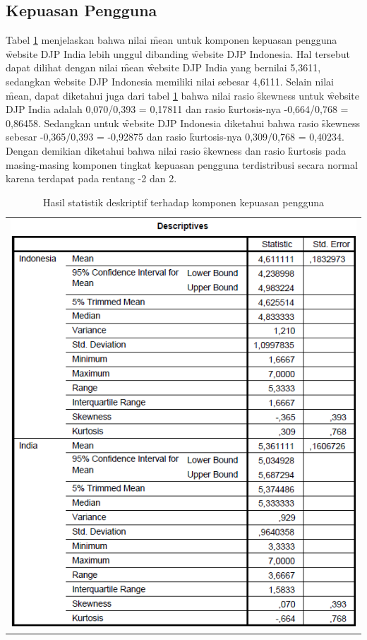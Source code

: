 \subsection{Kepuasan Pengguna}
Tabel \ref{tab:descsat} menjelaskan bahwa nilai \f{mean} untuk komponen kepuasan pengguna \f{website} DJP India lebih unggul dibanding \f{website} DJP Indonesia. Hal tersebut dapat dilihat dengan nilai \f{mean} \f{website} DJP India yang bernilai 5,3611, sedangkan \f{website} DJP Indonesia memiliki nilai sebesar 4,6111. Selain nilai \f{mean}, dapat diketahui juga dari tabel \ref{tab:descsat} bahwa nilai rasio \f{skewness} untuk \f{website} DJP India adalah 0,070/0,393 = 0,17811 dan rasio \f{kurtosis}-nya -0,664/0,768 = 0,86458. Sedangkan untuk \f{website} DJP Indonesia diketahui bahwa rasio \f{skewness} sebesar -0,365/0,393 = -0,92875 dan rasio \f{kurtosis}-nya 0,309/0,768 = 0,40234. Dengan demikian diketahui bahwa nilai rasio \f{skewness} dan rasio \f{kurtosis} pada masing-masing komponen tingkat kepuasan pengguna terdistribusi secara normal karena terdapat pada rentang -2 dan 2. 
\begin{table}
	\centering
	\caption{Hasil statistik deskriptif terhadap komponen kepuasan pengguna}
	\label{tab:descsat}
	\begin{tabular}{c}
		\includegraphics[width=\textwidth]
		{pics/ordinaldescSAT.PNG}
	\end{tabular}
\end{table}
